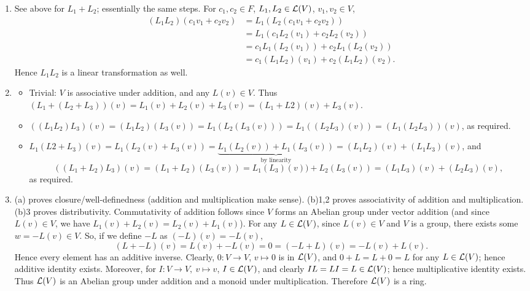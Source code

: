 \documentclass{homework}
\begin{document}
\begin{solution}
  \begin{enumerate}[label=(\alph*)]
    \item See above for $L_1+L_2$; essentially the same steps. For $c_1,c_2\in F$, $L_1,L_2\in
      \mathcal{L}(V)$, $v_1,v_2\in V$, 
      \begin{align*}
        (L_1L_2)(c_1v_1+c_2v_2)&= L_1(L_2(c_1v_1+c_2v_2)) \\
                               &=L_1(c_1L_2(v_1)+c_2L_2(v_2))\\
                               &=c_1L_1(L_2(v_1))+c_2L_1(L_2(v_2))\\
                               &=c_1(L_1L_2)(v_1)+c_2(L_1L_2)(v_2)
      .\end{align*}
      Hence $L_1L_2$ is a linear transformation as well.
    \item 
      \begin{itemize}
        \item Trivial: $V$ is associative under addition, and any $L(v)\in V$. Thus
          $(L_1+(L_2+L_3))(v)=L_1(v)+L_2(v)+L_3(v)=(L_1+L2)(v)+L_3(v)$.
        \item
          $((L_1L_2)L_3)(v)=(L_1L_2)(L_3(v))=L_1(L_2(L_3(v)))=L_1((L_2L_3)(v))=(L_1(L_2L_3))(v)$, as
          required.
        \item $L_1(L2+L_3)(v)=L_1(L_2(v)+L_3(v))=\underbrace{L_1(L_2(v))+L_1(L_3(v))}_\text{by
          linearity}=(L_1L_2)(v)+(L_1L_3)(v)$, and \[
            ((L_1+L_2)L_3)(v)=(L_1+L_2)(L_3(v))=L_1(L_3)(v))+L_2(L_3(v))=(L_1L_3)(v)+(L_2L_3)(v)
          ,\] as required.
      \end{itemize}
    \item (a) proves closure/well-definedness (addition and multiplication make sense). (b)1,2
      proves associativity of addition and multiplication. (b)3 proves distributivity. Commutativity
      of addition follows since $V$ forms an Abelian group under vector addition (and since $L(v)\in
      V$, we have $L_1(v)+L_2(v)=L_2(v)+L_1(v)$). For any $L\in \mathcal{L}(V)$, since $L(v)\in V$ and
      $V$ is a group, there exists some $w=-L(v)\in V$. So, if we define $-L$ as $(-L)(v)=-L(v)$, \[
        (L+ -L)(v)=L(v)+ -L(v)=0=(-L+L)(v)=-L(v)+L(v)
      .\] Hence every element has an additive inverse. Clearly, $0:V\to V$, $v\mapsto 0$ is in
      $\mathcal{L}(V)$, and $0+L=L+0=L$ for any $L\in \mathcal{L}(V)$; hence additive identity exists.
      Moreover, for $I:V\to V,\ v\mapsto v$, $I\in \mathcal{L}(V)$, and clearly $IL=LI=L\in \mathcal{L}(V)$;
      hence multiplicative identity exists. Thus $\mathcal{L}(V)$ is an Abelian group under addition and
      a monoid under multiplication. Therefore $\mathcal{L}(V)$ is a ring.
  \end{enumerate}
\end{solution}
\end{document}
